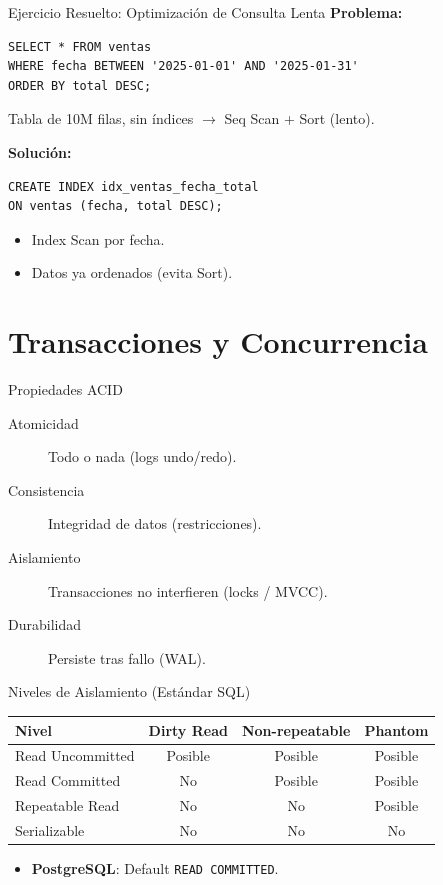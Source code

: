 \documentclass[aspectratio=169, 10pt, xcolor=table]{beamer}
\begin{document}
\begin{frame}[fragile]{Ejercicio Resuelto: Optimización de Consulta Lenta}
    \textbf{Problema:}
\begin{verbatim}
SELECT * FROM ventas 
WHERE fecha BETWEEN '2025-01-01' AND '2025-01-31' 
ORDER BY total DESC;
\end{verbatim}
    Tabla de 10M filas, sin índices $\rightarrow$ Seq Scan + Sort (lento).
    
    \textbf{Solución:}
\begin{verbatim}
CREATE INDEX idx_ventas_fecha_total 
ON ventas (fecha, total DESC);
\end{verbatim}
    \begin{itemize}
        \item Index Scan por fecha.
        \item Datos ya ordenados (evita Sort).
    \end{itemize}
\end{frame}

\section{Transacciones y Concurrencia}

\begin{frame}{Propiedades ACID}
    \begin{description}
        \item[Atomicidad] Todo o nada (logs undo/redo).
        \item[Consistencia] Integridad de datos (restricciones).
        \item[Aislamiento] Transacciones no interfieren (locks / MVCC).
        \item[Durabilidad] Persiste tras fallo (WAL).
    \end{description}
\end{frame}

\begin{frame}{Niveles de Aislamiento (Estándar SQL)}
    \begin{table}
        \centering
        \begin{tabular}{l|c|c|c}
            \toprule
            Nivel & Dirty Read & Non-repeatable & Phantom \\
            \midrule
            Read Uncommitted & Posible & Posible & Posible \\
            Read Committed & No & Posible & Posible \\
            Repeatable Read & No & No & Posible \\
            Serializable & No & No & No \\
            \bottomrule
        \end{tabular}
    \end{table}
    \begin{itemize}
        \item \textbf{PostgreSQL}: Default \texttt{READ COMMITTED}.
    \end{itemize}
\end{frame}
\end{document}
